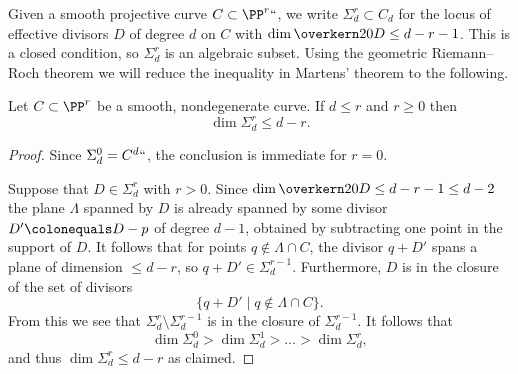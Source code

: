 Given 
a smooth projective curve $C \subset \PP^r` `$, we write $
\Sigma^r_d
\subset C_d$ 
%
for the locus of effective divisors $D$ of degree $d$ on
$C$ with $\dim \overkern20 D \leq d-r-1$. This is a closed condition, so 
$\Sigma^r_d$ is an algebraic subset. Using the 
geometric Riemann--Roch theorem
we will reduce the inequality in Martens' theorem to the following.

\begin{lemma}\label{elementary secant plane lemma}
Let 
%
$C \subset \PP^r$ be a smooth, nondegenerate curve. If $d \leq r$ and $r \geq 0$ then
$$
\dim \Sigma^r_d \leq d-r.
$$
\end{lemma}

\begin{proof}
Since $\Sigma^0_d = C^d` `$, the conclusion is immediate for $r=0$.

Suppose that  $D\in \Sigma^r_d$ with $r>0$. Since $\dim \overkern20 D\leq d-r-1\leq d-2$ the plane
$\Lambda$ spanned by $D$ is already spanned by some divisor  $D' \colonequals D -p$ of degree $d-1$, 
obtained by subtracting one point  in the support of $D$.
It follows that for points $q\notin \Lambda \cap C$, the divisor $q+D'$ spans a plane of dimension $\leq d-r$, 
so $q+D'\in \Sigma^{r-1}_{d}$.
Furthermore,  $D$ is in the closure of the set of divisors
$$
\{q+D' \mid q\notin \Lambda \cap C \}.
$$
From this we see that $\Sigma^r_d\setminus \Sigma^{r-1}_d$ is in the closure of  $\Sigma^{r-1}_d$. It follows that 
$$
\dim \Sigma^0_d >  \dim \Sigma^1_d > \dots > \dim \Sigma^r_d,
$$ 
and thus $\dim \Sigma^r_d \leq d-r$ as claimed.
\end{proof}

